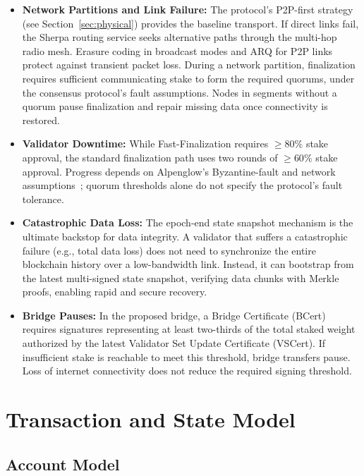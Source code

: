 \documentclass{article}
\begin{document}
\begin{itemize}
    \item \textbf{Network Partitions and Link Failure:} The protocol's P2P-first strategy (see Section~\ref{sec:physical}) provides the baseline transport. If direct links fail, the Sherpa routing service seeks alternative paths through the multi-hop radio mesh. Erasure coding in broadcast modes and ARQ for P2P links protect against transient packet loss. During a network partition, finalization requires sufficient communicating stake to form the required quorums, under the consensus protocol's fault assumptions. Nodes in segments without a quorum pause finalization and repair missing data once connectivity is restored.

    \item \textbf{Validator Downtime:} While Fast-Finalization requires $\geq 80\%$ stake approval, the standard finalization path uses two rounds of $\geq 60\%$ stake approval. Progress depends on Alpenglow's Byzantine-fault and network assumptions~\cite{alpenglow}; quorum thresholds alone do not specify the protocol's fault tolerance.

    \item \textbf{Catastrophic Data Loss:} The epoch-end state snapshot mechanism is the ultimate backstop for data integrity. A validator that suffers a catastrophic failure (e.g., total data loss) does not need to synchronize the entire blockchain history over a low-bandwidth link. Instead, it can bootstrap from the latest multi-signed state snapshot, verifying data chunks with Merkle proofs, enabling rapid and secure recovery.

    \item \textbf{Bridge Pauses:} In the proposed bridge, a Bridge Certificate (BCert) requires signatures representing at least two-thirds of the total staked weight authorized by the latest Validator Set Update Certificate (VSCert). If insufficient stake is reachable to meet this threshold, bridge transfers pause. Loss of internet connectivity does not reduce the required signing threshold.
\end{itemize}

\section{Transaction and State Model}
\label{sec:transaction_state}

\subsection{Account Model}
\label{sec:account_model}
\end{document}
